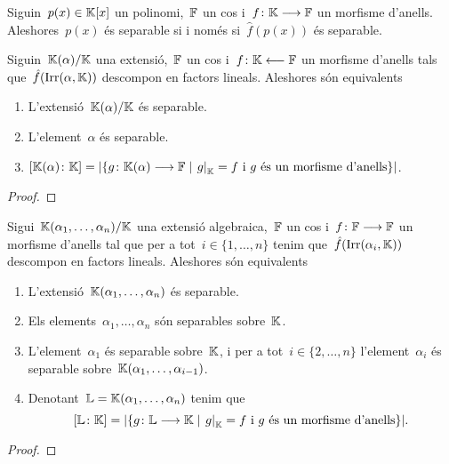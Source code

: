\documentclass[../Apunts.tex]{subfiles}
\begin{document}
	\begin{lemma}
		\label{lema:un polinomi és separable si i només si ho és adaptant els coeficients}
		Siguin~\(p(x)\in\mathbb{K}[x]\) un polinomi,~\(\mathbb{F}\) un cos i~\(f\colon\mathbb{K}\longrightarrow\mathbb{F}\) un morfisme d'anells. Aleshores~\(p(x)\) és separable si i només si~\(\hat{f}(p(x))\) és separable.	
	\end{lemma}
	\begin{lemma}
		\label{lema:condicions pel nombre d'extensions de morfismes}
		Siguin~\(\mathbb{K}(\alpha)/\mathbb{K}\) una extensió,~\(\mathbb{F}\) un cos i~\(f\colon\mathbb{K}\longleftarrow\mathbb{F}\) un morfisme d'anells tals que~\(\hat{f}(\operatorname{Irr}(\alpha,\mathbb{K}))\) descompon en factors lineals. Aleshores són equivalents
		\begin{enumerate}
			\item\label{lema:condicions pel nombre d'extensions de morfismes:eq1} L'extensió~\(\mathbb{K}(\alpha)/\mathbb{K}\) és separable.
			\item\label{lema:condicions pel nombre d'extensions de morfismes:eq2} L'element~\(\alpha\) és separable.
			\item\label{lema:condicions pel nombre d'extensions de morfismes:eq3} \(\grauExtensio{\KK(\alpha)}{\KK}=\card{\{g\colon\KK(\alpha)\longrightarrow\FF\mid\left.g\right|_{\KK}=f\text{ i }g\text{ és un morfisme d'anells}\}}\).
		\end{enumerate}
	\end{lemma}
	\begin{proof}
	\end{proof}
	\begin{theorem}
		\label{thm:Teorema de separabilitat}
		Sigui~\(\mathbb{K}(\alpha_{1},\dots,\alpha_{n})/\mathbb{K}\) una extensió algebraica,~\(\mathbb{F}\) un cos i~\(f\colon\mathbb{F}\longrightarrow\mathbb{F}\) un morfisme d'anells tal que per a tot~\(i\in\{1,\dots,n\}\) tenim que~\(\hat{f}(\operatorname{Irr}(\alpha_{i},\mathbb{K}))\) descompon en factors lineals. Aleshores són equivalents
		\begin{enumerate}
			\item L'extensió~\(\mathbb{K}(\alpha_{1},\dots,\alpha_{n})\) és separable.
			\item Els elements~\(\alpha_{1},\dots,\alpha_{n}\) són separables sobre~\(\mathbb{K}\).
			\item L'element~\(\alpha_{1}\) és separable sobre~\(\mathbb{K}\), i per a tot~\(i\in\{2,\dots,n\}\) l'element~\(\alpha_{i}\) és separable sobre~\(\mathbb{K}(\alpha_{1},\dots,\alpha_{i-1})\).
				\item Denotant~\(\mathbb{L}=\mathbb{K}(\alpha_{1},\dots,\alpha_{n})\) tenim que
				\[\grauExtensio{\LL}{\KK}=\card{\{g\colon\LL\longrightarrow\KK\mid\left.g\right|_{\KK}=f\text{ i }g\text{ és un morfisme d'anells}\}}.\]
		\end{enumerate}
	\end{theorem}
	\begin{proof}
	\end{proof}
\end{document}
